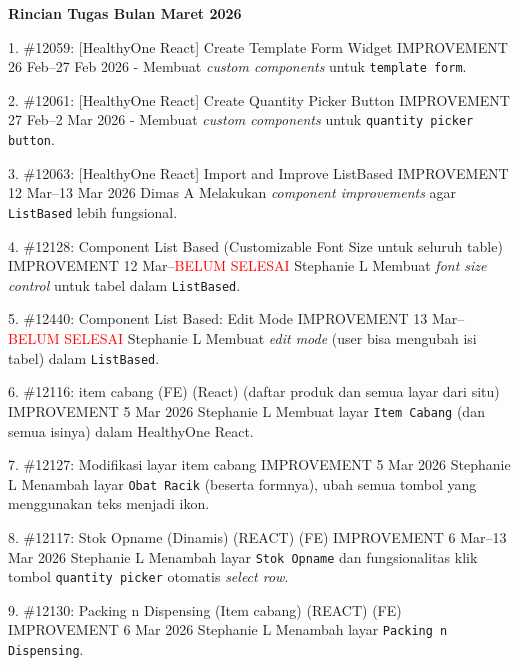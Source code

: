 
\textbf{Rincian Tugas Bulan Maret 2026}
\begin{tasktable}

    \taskentry
    {1.}
    {
        \#12059: [HealthyOne React] Create Template Form Widget
    }{IMPROVEMENT}{
        26 Feb--27 Feb 2026
    }{-}{
        Membuat \textit{custom components} untuk \texttt{template form}.
    }
    
    \taskentry
    {2.}
    {
        \#12061: [HealthyOne React] Create Quantity Picker Button
    }{IMPROVEMENT}{
        27 Feb--2 Mar 2026
    }{-}{
        Membuat \textit{custom components} untuk \texttt{quantity picker button}.
    }

    \taskentry
    {3.}
    {
        \#12063: [HealthyOne React] Import and Improve ListBased 
    }{IMPROVEMENT}{
        12 Mar--13 Mar 2026
    }{Dimas A}{
        Melakukan \textit{component improvements} agar \texttt{ListBased} lebih fungsional.
    }

    \taskentry
    {4.}
    {
        \#12128: Component List Based (Customizable Font Size untuk seluruh table)
    }{IMPROVEMENT}{
        12 Mar--\textcolor{red}{BELUM SELESAI}
    }{Stephanie L}{
        Membuat \textit{font size control} untuk tabel dalam \texttt{ListBased}.
    }

    \taskentry
    {5.}
    {
        \#12440: Component List Based: Edit Mode
    }{IMPROVEMENT}{
        13 Mar--\textcolor{red}{BELUM SELESAI}
    }{Stephanie L}{
        Membuat \textit{edit mode} (user bisa mengubah isi tabel) dalam \texttt{ListBased}.
    }

    \taskentry
    {6.}
    {
        \#12116: item cabang (FE) (React) (daftar produk dan semua layar dari situ)
    }{IMPROVEMENT}{
        5 Mar 2026
    }{Stephanie L}{
        Membuat layar \texttt{Item Cabang} (dan semua isinya) dalam HealthyOne React.
    }
    
    \taskentry
    {7.}
    {
        \#12127: Modifikasi layar item cabang
    }{IMPROVEMENT}{
        5 Mar 2026
    }{Stephanie L}{
        Menambah layar \texttt{Obat Racik} (beserta formnya), ubah semua tombol yang menggunakan teks menjadi ikon.
    }

    \taskentry
    {8.}
    {
        \#12117: Stok Opname (Dinamis) (REACT) (FE)
    }{IMPROVEMENT}{
        6 Mar--13 Mar 2026
    }{Stephanie L}{
        Menambah layar \texttt{Stok Opname} dan fungsionalitas klik tombol \texttt{quantity picker} otomatis \textit{select row}.
    }

    \taskentry
    {9.}
    {
        \#12130: Packing n Dispensing (Item cabang) (REACT) (FE)
    }{IMPROVEMENT}{
        6 Mar 2026
    }{Stephanie L}{
        Menambah layar \texttt{Packing n Dispensing}.
    }


\end{tasktable}
